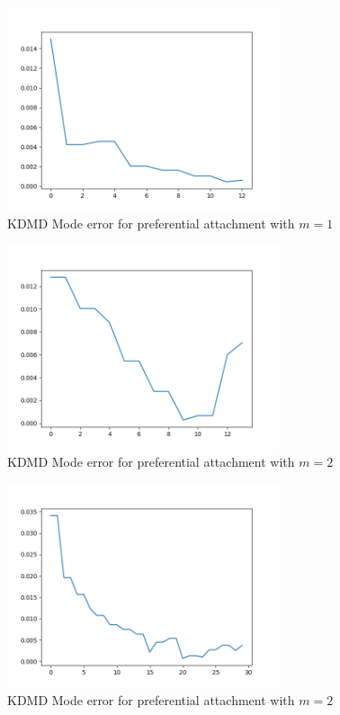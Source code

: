 \begin{figure}
    \includegraphics[width=8cm]{Images/mode_error_kdmd_prefattach1.png}
    \centering
    \caption{KDMD Mode error for preferential attachment with $m=1$}
\end{figure}

\begin{figure}
    \includegraphics[width=8cm]{Images/mode_error_dmd_prefattach2.png}
    \centering
    \caption{KDMD Mode error for preferential attachment with $m=2$}
\end{figure}

\begin{figure}
    \includegraphics[width=8cm]{Images/mode_error_kdmd_prefattach2.png}
    \centering
    \caption{KDMD Mode error for preferential attachment with $m=2$}
\end{figure}

